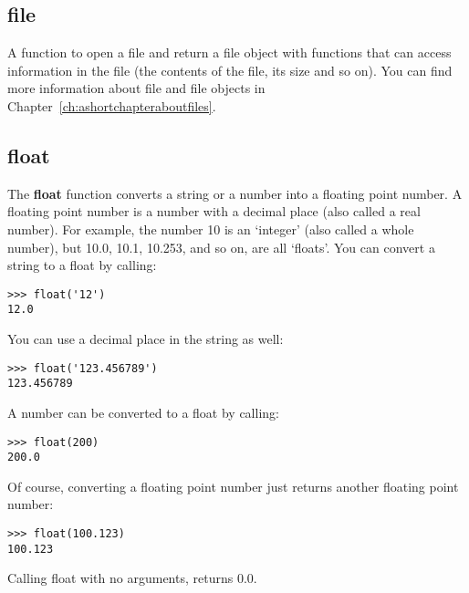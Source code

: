 \subsection*{file}

A function to open a file and return a file object with functions that can access information in the file (the contents of the file, its size and so on). You can find more information about file and file objects in Chapter~\ref{ch:ashortchapteraboutfiles}.

\subsection*{float}

The \textbf{float} function converts a string or a number into a floating point number. A floating point number is a number with a decimal place (also called a real number). For example, the number 10 is an `integer' (also called a whole number), but 10.0, 10.1, 10.253, and so on, are all `floats'. You can convert a string to a float by calling:

\begin{Verbatim}[frame=single]
>>> float('12')
12.0
\end{Verbatim}

\noindent
You can use a decimal place in the string as well:

\begin{Verbatim}[frame=single]
>>> float('123.456789')
123.456789
\end{Verbatim}

\noindent
A number can be converted to a float by calling:

\begin{Verbatim}[frame=single]
>>> float(200)
200.0
\end{Verbatim}

\noindent
Of course, converting a floating point number just returns another floating point number:

\begin{Verbatim}[frame=single]
>>> float(100.123)
100.123
\end{Verbatim}

\noindent
Calling float with no arguments, returns 0.0.

